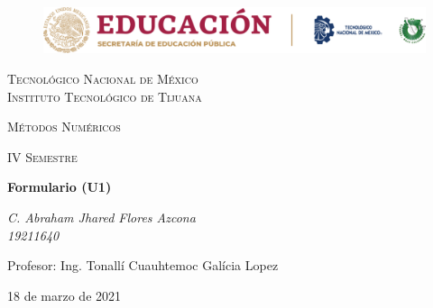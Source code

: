 \documentclass[letterpaper, 12pt]{article}
\begin{document}
    
    \begin{titlepage}
        \begin{figure}[ht]
            \centering
            \includegraphics[width=15cm]{logosITT.png}
        \end{figure}
        \centering
        {\scshape\LARGE Tecnológico Nacional de México\\Instituto Tecnológico de Tijuana\par}
        \vspace{1cm}
        {\scshape\Large Métodos Numéricos\par}
        \vspace{1cm}
        {\scshape\Large IV Semestre\par}
        \vspace{1.5cm}
        {\huge\bfseries Formulario (U1)\par}
        \vspace{2cm}
        {\Large\itshape C. Abraham Jhared Flores Azcona\\19211640\par}
        \vfill
        Profesor: Ing. Tonallí Cuauhtemoc Galícia Lopez\par
        
        \vfill

        {\large 18 de marzo de 2021}
    \end{titlepage}
\end{document}
